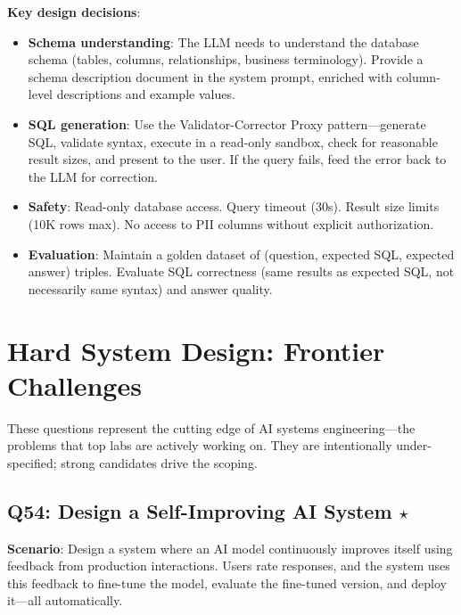 \textbf{Key design decisions}:
\begin{itemize}[leftmargin=*]
    \item \textbf{Schema understanding}: The LLM needs to understand the database schema (tables, columns, relationships, business terminology). Provide a schema description document in the system prompt, enriched with column-level descriptions and example values.
    \item \textbf{SQL generation}: Use the Validator-Corrector Proxy pattern---generate SQL, validate syntax, execute in a read-only sandbox, check for reasonable result sizes, and present to the user. If the query fails, feed the error back to the LLM for correction.
    \item \textbf{Safety}: Read-only database access. Query timeout (30s). Result size limits (10K rows max). No access to PII columns without explicit authorization.
    \item \textbf{Evaluation}: Maintain a golden dataset of (question, expected SQL, expected answer) triples. Evaluate SQL correctness (same results as expected SQL, not necessarily same syntax) and answer quality.
\end{itemize}


\section{Hard System Design: Frontier Challenges}
\label{sec:hard-frontier}

These questions represent the cutting edge of AI systems engineering---the problems that top labs are actively working on. They are intentionally under-specified; strong candidates drive the scoping.

\subsection{Q54: Design a Self-Improving AI System $\star$}

\textbf{Scenario}: Design a system where an AI model continuously improves itself using feedback from production interactions. Users rate responses, and the system uses this feedback to fine-tune the model, evaluate the fine-tuned version, and deploy it---all automatically.

